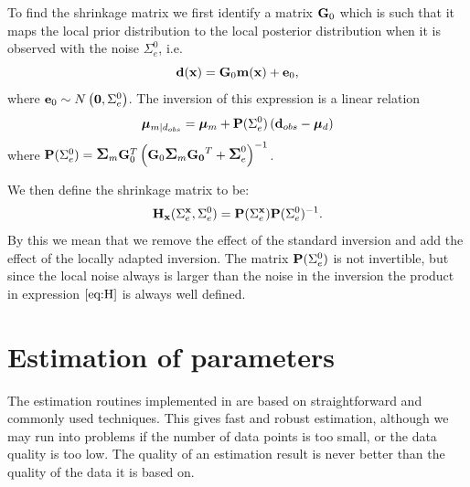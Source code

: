 To find the shrinkage matrix we first identify a matrix $\mathbf{G}_0$
which is such that it maps the local prior distribution to the local posterior distribution
when it is observed with the noise $\Sigma_{e}^0$, i.e.
$$ \mathbf{d}(\mathbf{x}) = \mathbf{G}_0\mathbf{m}(\mathbf{x})+\mathbf{e}_0,$$
where $\mathbf{e}_0\sim N\left( \mathbf{0},\Sigma_{e}^0\right)$.
The inversion of this expression is a linear relation
 \begin{equation} \label{eq:PSigmae}
\bm\mu_{m|d_{obs}} =\bm\mu_{m} +\mathbf{P}(\Sigma_{e}^0)\left(\mathbf{d}_{obs}-\bm\mu_{d}\right)
\end{equation}
where  $\mathbf{P}(\Sigma_{e}^0)=\mbox{\large\ensuremath{\boldsymbol{\Sigma}}}_{m}\mathbf{G}_0^T \left( \mathbf{G}_0\mbox{\large\ensuremath{\boldsymbol{\Sigma}}}_{m}\mathbf{G_0}^T+\mbox{\large\ensuremath{\boldsymbol{\Sigma}}}_{e}^0\right)^{-1}$.

We then define the shrinkage matrix to be:
\begin{equation}\label{eq:H}
\mathbf{H_x}(\Sigma_{e}^{\mathbf{x}},\Sigma_{e}^0) = \mathbf{P}(\Sigma_{e}^{\mathbf{x}})\mathbf{P}(\Sigma_{e}^0)^{-1}.
\end{equation}
By this we mean that we remove the effect of the standard inversion and add the effect of
the locally adapted inversion. The matrix $\mathbf{P}(\Sigma_{e}^0)$ is not invertible,
but since the local noise always is larger than the noise in the inversion the product in
expression $\ref{eq:H}$ is always well defined.


\section{Estimation of parameters}
\label{sec:estimateimp}
The estimation routines implemented in \crava are based on straightforward and commonly used techniques. This gives fast and robust estimation, although we may run into problems if the number of data points is too small, or the data quality is too low. The quality of an estimation result is never better than the quality of the data it is based on.
